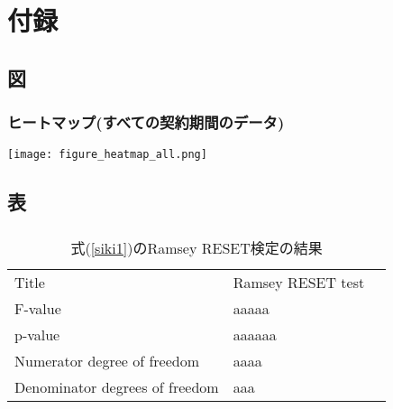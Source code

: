 \documentclass[../main]{subfiles}
\begin{document}
    \section*{付録}
    \setcounter{subsection}{0} %
    \renewcommand{\thesubsection}{\Alph{subsection}} %
    \setcounter{subsubsection}{0} %
    \renewcommand{\thesubsubsection}{\Alph{subsection}.\arabic{subsubsection}}
    \setcounter{equation}{0} %
    \renewcommand{\theequation}{\Alph{subsection}.\arabic{equation}}
    \setcounter{figure}{0} %
    \renewcommand{\thefigure}{\Alph{subsection}.\arabic{figure}}
    \setcounter{table}{0} %
    \renewcommand{\thetable}{\Alph{subsection}.\arabic{table}}

  
\subsection{図}
\subsubsection{ヒートマップ(すべての契約期間のデータ)}
\label{heatmap_all}
\texttt{[image: figure\_heatmap\_all.png]}\\

\clearpage

\subsection{表}

\subsubsection{   }
  \begin{table}[!htbp] \centering 
    \caption{式(\ref{siki1})のRamsey RESET検定の結果} 
    \label{hyob_spec1_reset} 
      \begin{tabular}{lll}
        Title                          &       Ramsey RESET test \\
        F-value                        &         aaaaa \\
        p-value                        &  aaaaaa \\
        Numerator degree of freedom    &                     aaaa \\
        Denominator degrees of freedom &                   aaa \\
        \end{tabular}
  \end{table} 
  
\end{document}
